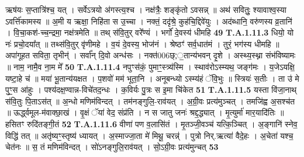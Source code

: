 \documentclass[17pt]{extarticle}
\begin{document}
                  ऋष॑यः स॒प्तात्रि॑श्च॒ यत् । सर्वेऽत्रयो अ॑गस्त्य॒श्च ।  नक्ष॑त्रैः॒ शङ्कृ॑तो ऽवसन्न् ॥ अथ॑ सवितुः॒ श्यावाश्व॒स्या ऽवर्त्ति॑कामस्य ॥ अ॒मी य ऋक्षा॒ निहि॑ता स उ॒च्चा । नक्तं॒ ददृ॑श्रे॒ कुह॑चि॒द्दिवे॑युः ।  अद॑ब्धानि॒ वरु॑णस्य व्र॒तानि॑ । वि॒चा॒कश॑-च्च॒न्द्रमा॒ नक्ष॑त्रमेति ॥  तथ् स॑वि॒तुर् वरे᳚ण्यं । भर्गो॑ दे॒वस्य॑ धीमहि \textbf{ 49} \newline
                  \newline
                                                                  \textbf{ T.A.1.11.3} \newline
                  धियो॒ यो नः॑ प्रचो॒दया᳚त् ॥ तथ्स॑वि॒तुर् वृ॑णीमहे ।  व॒यं दे॒वस्य॒ भोज॑नं । श्रेष्ठꣳ॑ सर्व॒धात॑मं । तुरं॒ भग॑स्य धीमहि ॥  अपा॑गूहत सविता॒ तृभीन्॑ । सर्वा᳚न् दि॒वो अन्ध॑सः ।  नक्त॑006छ्;॒तान्य॑भवन् दृ॒शे । अस्थ्य॒स्थ्ना संभ॑विष्यामः ॥ नाम॒ नामै॒व ना॒म मे᳚ \textbf{ 50} \newline
                  \newline
                                                                  \textbf{ T.A.1.11.4} \newline
                  नपुꣳस॑कं॒ पुमाꣳ॒॒स्त्र्य॑स्मि । स्थाव॑रोऽस्म्यथ॒ जङ्ग॑मः ।  य॒जेऽयक्षि॒ यष्टा॒हे च॑ ॥ मया॑ भू॒तान्य॑यक्षत । प॒शवो॑ मम॑ भूता॒नि । अनूबन्ध्यो ऽस्म्य॑हं ॅवि॒भुः ॥ स्त्रियः॑ स॒तीः । ता उ॑ मे पुꣳ॒॒स आ॑हुः ।  पश्य॑दक्ष॒ण्वान्न-विचे॑तद॒न्धः । क॒विर्यः पु॒त्रः स इ॒मा चि॑केत \textbf{ 51} \newline
                  \newline
                                                                  \textbf{ T.A.1.11.5} \newline
                  यस्ता वि॑जा॒नाथ् स॑वि॒तुः पि॒ताऽस॑त् ॥ अ॒न्धो मणिम॑विन्दत् । तम॑नङ्गुलि॒-राव॑यत् । अ॒ग्री॒वः प्रत्य॑मुञ्चत् । तमजि॑ह्व अ॒सश्च॑त ॥  ऊर्द्ध्वमूल-म॑वाक्छा॒खं । वृ॒क्षं ॅया॑ वेद॒ संप्र॑ति । न स जातु जनः॑ श्रद्द॒द्ध्यात् । मृ॒त्युर्मा॑ मार॒यादि॑तिः ॥ हसितꣳ रुदि॑तङ्गी॒तं \textbf{ 52} \newline
                  \newline
                                                                  \textbf{ T.A.1.11.6} \newline
                  वीणा॑ पण व॒लासि॑तं । मृ॒तञ्जी॒वञ्च॑ यत्कि॒ञ्चित् ।  अ॒ङ्गानि॑ स्नेव॒ विद्धि॑ तत् ॥ अतृ॑ष्यꣳ॒॒स्तृष्य॑ ध्यायत् । अ॒स्माज्जा॒ता मे॑ मिथू॒ चरन्न्॑ । पुत्रो निर्.ऋत्या॑ वैदे॒हः । अ॒चेता॑ यश्च॒ चेत॑नः ॥ स॒ तं मणिम॑विन्दत् । सो॑ऽनङ्गुलि॒राव॑यत् ।  सो॒ऽग्री॒वः प्रत्य॑मुन्चत् \textbf{ 53} \newline
                  \newline
\end{document}
